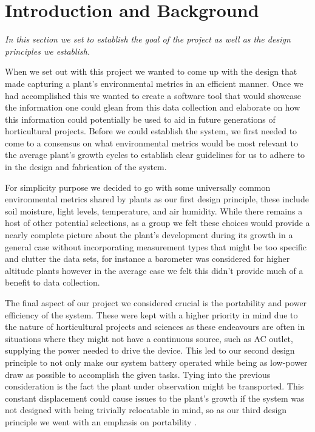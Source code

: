 \documentclass[comsoc, 12pt]{IEEEtran}
\begin{document}
\section{Introduction and Background}
\begin{center}
    \textit{In this section we set to establish the goal of the project as well as the design principles we establish.}
\end{center}
\par When we set out with this project we wanted to come up with the design that made capturing a plant's environmental metrics in an efficient manner. Once we had accomplished this we wanted to create a software tool that would showcase the information one could glean from this data collection and elaborate on how this information could potentially be used to aid in future generations of horticultural projects. Before we could establish the system, we first needed to come to a consensus on what environmental metrics would be most relevant to the average plant's growth cycles to establish clear guidelines for us to adhere to in the design and fabrication of the system. \par
For simplicity purpose we decided to go with some universally common environmental metrics shared by plants as our first design principle, these include soil moisture, light levels, temperature, and air humidity. While there remains a host of other potential selections, as a group we felt these choices would provide a nearly complete picture about the plant's development during its growth in a general case without incorporating measurement types that might be too specific and clutter the data sets, for instance a barometer was considered for higher altitude plants however in the average case we felt this didn't provide much of a benefit to data collection.  \par
The final aspect of our project we considered crucial is the portability and power efficiency of the system. These were kept with a higher priority in mind due to the nature of horticultural projects and sciences as these endeavours are often in situations where they might not have a continuous source, such as AC outlet, supplying the power needed to drive the device. This led to our second design principle to not only make our system battery operated while being as low-power draw as possible to accomplish the given tasks. Tying into the previous consideration is the fact the plant under observation might be transported. This constant displacement could cause issues to the plant's growth if the system was not designed with being trivially relocatable in mind, so as our third design principle we went with an emphasis on portability .
\end{document}

